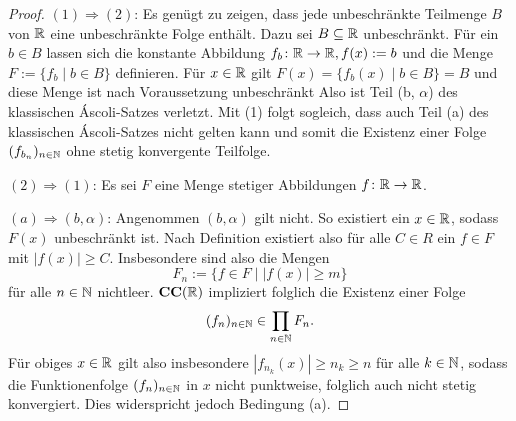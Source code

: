 \begin{proof}
  $(1) \Rightarrow (2)$:
  Es genügt zu zeigen, dass jede unbeschränkte Teilmenge $B$ von $\mathbb{R}$ eine unbeschränkte Folge enthält.
  Dazu sei $B \subseteq \mathbb{R}$ unbeschränkt.
  Für ein $b \in B$ lassen sich die konstante Abbildung $f_b \colon \mathbb{R} \to \mathbb{R}, f(x):= b$ und die Menge $F := \{f_b \mid b \in B\}$ definieren.
  Für $x \in \mathbb{R}$ gilt $F(x) = \{f_b(x) \mid b \in B\} = B$ und diese Menge ist nach Voraussetzung unbeschränkt
  Also ist Teil (b, $\alpha$) des klassischen Áscoli-Satzes verletzt.
  Mit (1) folgt sogleich, dass auch Teil (a) des klassischen Áscoli-Satzes nicht gelten kann und somit die Existenz einer Folge $(f_{b_n})_{n \in \mathbb{N}}$ ohne stetig konvergente Teilfolge.

  $(2) \Rightarrow (1)$:
  Es sei $F$ eine Menge stetiger Abbildungen $f \colon \mathbb{R} \to \mathbb{R}$.

  $(a) \Rightarrow (b,\alpha)$:
  Angenommen $(b,\alpha)$ gilt nicht. So existiert ein $x \in \mathbb{R}$, sodass $F(x)$ unbeschränkt ist.
  Nach Definition existiert also für alle $C \in R$ ein $f \in F$ mit $|f(x)| \geq C$.
  Insbesondere sind also die Mengen 
  \begin{displaymath}
    F_n := \{ f \in F \mid |f(x)| \geq m \}
  \end{displaymath}
  für alle $n \in \mathbb{N}$ nichtleer.
  $\mathbf{CC}(\mathbb{R})$ impliziert folglich die Existenz einer Folge 
  \begin{displaymath}
    (f_n)_{n \in \mathbb{N}} \in \prod_{n \in \mathbb{N}} F_n.
  \end{displaymath}
  Für obiges $x \in \mathbb{R}$ gilt also insbesondere $|f_{n_k}(x)| \geq n_k \geq n$ für alle $k \in \mathbb{N}$, sodass die Funktionenfolge $(f_n)_{n \in \mathbb{N}}$ in $x$ nicht punktweise, folglich auch nicht stetig konvergiert.
  Dies widerspricht jedoch Bedingung (a).


\end{proof}
